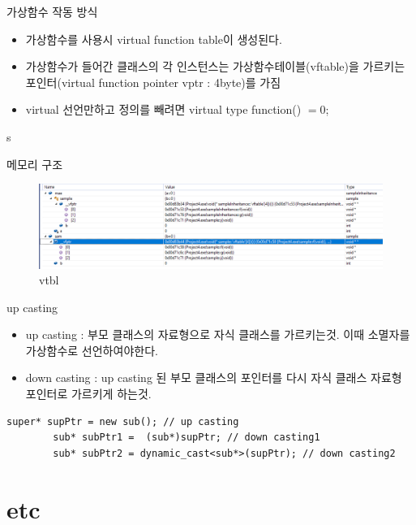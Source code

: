 \documentclass[10pt]{beamer}
\begin{document}
\begin{frame}{가상함수 작동 방식}
    \begin{itemize}
        \item 가상함수를 사용시 virtual function table이 생성된다.
        \item 가상함수가 들어간 클래스의 각 인스턴스는 가상함수테이블(vftable)을 가르키는 포인터(virtual function pointer vptr : 4byte)를 가짐
        \item virtual 선언만하고 정의를 빼려면 virtual type function() $=0$;
    \end{itemize}s
\end{frame}


\begin{frame}[fragile]{메모리 구조}
    \begin{figure}[h!]
        \includegraphics[scale=0.35]{virtual_table}
        \caption{vtbl}
    \end{figure}
\end{frame}    


\begin{frame}[fragile]{up casting}
    \begin{itemize}
        \item up casting : 부모 클래스의 자료형으로 자식 클래스를 가르키는것. 이때 소멸자를 가상함수로 선언하여야한다.
        \item down casting : up casting 된 부모 클래스의 포인터를 다시 자식 클래스 자료형 포인터로 가르키게 하는것.
    \end{itemize}
    \begin{lstlisting}[style = CppStyle]
        super* supPtr = new sub(); // up casting
        sub* subPtr1 =  (sub*)supPtr; // down casting1
        sub* subPtr2 = dynamic_cast<sub*>(supPtr); // down casting2
    \end{lstlisting}
\end{frame}

\section{etc}
\end{document}
